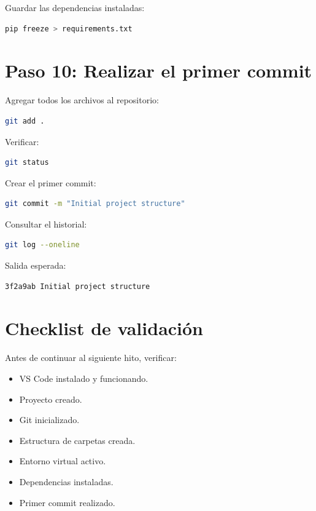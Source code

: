 Guardar las dependencias instaladas:

\begin{lstlisting}[language=bash]
pip freeze > requirements.txt
\end{lstlisting}

\section{Paso 10: Realizar el primer commit}

Agregar todos los archivos al repositorio:

\begin{lstlisting}[language=bash]
git add .
\end{lstlisting}

Verificar:

\begin{lstlisting}[language=bash]
git status
\end{lstlisting}

Crear el primer commit:

\begin{lstlisting}[language=bash]
git commit -m "Initial project structure"
\end{lstlisting}

Consultar el historial:

\begin{lstlisting}[language=bash]
git log --oneline
\end{lstlisting}

Salida esperada:

\begin{verbatim}
3f2a9ab Initial project structure
\end{verbatim}

\section{Checklist de validación}

Antes de continuar al siguiente hito, verificar:

\begin{itemize}
\item[$\square$] VS Code instalado y funcionando.
\item[$\square$] Proyecto creado.
\item[$\square$] Git inicializado.
\item[$\square$] Estructura de carpetas creada.
\item[$\square$] Entorno virtual activo.
\item[$\square$] Dependencias instaladas.
\item[$\square$] Primer commit realizado.
\end{itemize}

